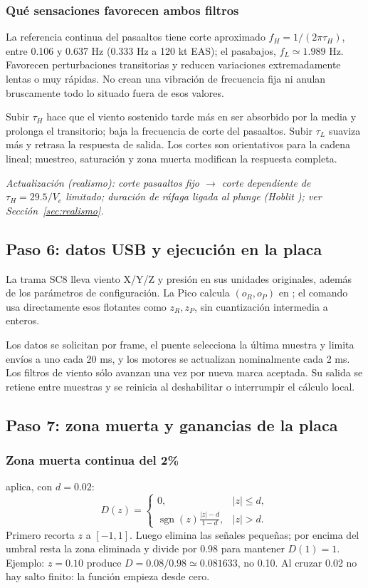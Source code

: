 \subsubsection{Qué sensaciones favorecen ambos filtros}
La referencia continua del pasaaltos tiene corte aproximado $f_H=1/(2\pi\tau_H)$, entre 0.106 y 0.637 Hz (0.333 Hz a 120 kt EAS); el pasabajos, $f_L\simeq1.989$ Hz. Favorecen perturbaciones transitorias y reducen variaciones extremadamente lentas o muy rápidas. No crean una vibración de frecuencia fija ni anulan bruscamente todo lo situado fuera de esos valores.

Subir $\tau_H$ hace que el viento sostenido tarde más en ser absorbido por la media y prolonga el transitorio; baja la frecuencia de corte del pasaaltos. Subir $\tau_L$ suaviza más y retrasa la respuesta de salida. Los cortes son orientativos para la cadena lineal; muestreo, saturación y zona muerta modifican la respuesta completa.

\textit{Actualización (realismo): corte pasaaltos fijo $\rightarrow$ corte dependiente de $\tau_H=29.5/V_e$ limitado; duración de ráfaga ligada al plunge (Hoblit \cite{hoblit1988}); ver Sección~\ref{sec:realismo}.}

\subsection{Paso 6: datos USB y ejecución en la placa}
La trama SC8 lleva viento X/Y/Z y presión en sus unidades originales, además de los parámetros de configuración. La Pico calcula $(o_R,o_P)$ en ; el comando usa directamente esos flotantes como $z_R,z_P$, sin cuantización intermedia a enteros.

Los datos se solicitan por frame, el puente selecciona la última muestra y limita envíos a uno cada 20 ms, y los motores se actualizan nominalmente cada 2 ms. Los filtros de viento sólo avanzan una vez por nueva marca aceptada. Su salida se retiene entre muestras y se reinicia al deshabilitar o interrumpir el cálculo local.

\subsection{Paso 7: zona muerta y ganancias de la placa}
\subsubsection{Zona muerta continua del 2\%}
 aplica, con $d=0.02$:
\begin{equation}
D(z)=\begin{cases}
0,&|z|\le d,\\[2pt]
\displaystyle\operatorname{sgn}(z)\frac{|z|-d}{1-d},&|z|>d.
\end{cases}
\label{eq:turb-dead}
\end{equation}
Primero recorta $z$ a $[-1,1]$. Luego elimina las señales pequeñas; por encima del umbral resta la zona eliminada y divide por 0.98 para mantener $D(1)=1$. Ejemplo: $z=0.10$ produce $D=0.08/0.98\simeq0.081633$, no 0.10. Al cruzar 0.02 no hay salto finito: la función empieza desde cero.

